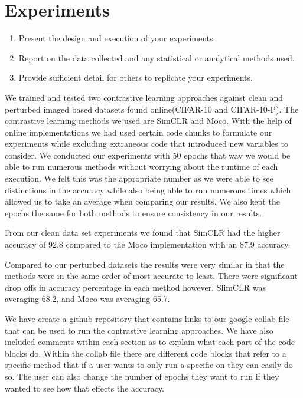 \section{Experiments}

\begin{enumerate}
    \item Present the design and execution of your experiments.
    \item Report on the data collected and any statistical or analytical methods used.
    \item Provide sufficient detail for others to replicate your experiments.
\end{enumerate}

We trained and tested two contrastive learning approaches against clean and perturbed imaged based datasets found online(CIFAR-10 and CIFAR-10-P). The contrastive learning methods we used are SimCLR and Moco. With the help of online implementations we had used certain code chunks to formulate our experiments while excluding extraneous code that introduced new variables to consider. We conducted our experiments with 50 epochs that way we would be able to run numerous methods without worrying about the runtime of each execution. We felt this was the appropriate number as we were able to see  distinctions in the accuracy while also being able to run numerous times which allowed us to take an average when comparing our results. We also kept the epochs the same for both methods to ensure consistency in our results. 

From our clean data set experiments we found that SimCLR had the higher accuracy of 92.8 compared to the Moco implementation with an 87.9 accuracy. 

Compared to our perturbed datasets the results were very similar in that the methods were in the same order of most accurate to least. There were significant drop offs in accuracy percentage in each method however. SlimCLR was averaging 68.2, and Moco was averaging 65.7. 

We have create a github repository that contains links to our google collab file that can be used to run the contrastive learning approaches. We have also included comments within each section as to explain what each part of the code blocks do. Within the collab file there are different code blocks that refer to a specific method that if a user wants to only run a specific on they can easily do so. The user can also change the number of epochs they want to run if they wanted to see how that effects the accuracy.
